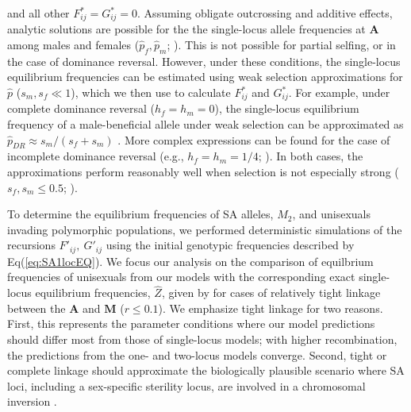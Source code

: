 \documentclass[9pt,twocolumn,twoside,lineno]{gsajnl}
\begin{document}
\noindent and all other $F^{\ast}_{ij} = G^{\ast}_{ij} =0$. Assuming obligate outcrossing and additive effects, analytic solutions are possible for the the single-locus allele frequencies at $\mathbf{A}$ among males and females ($\hat{p}_f,\hat{p}_m$; \citealt{Kidwell1977}). This is not possible for partial selfing, or in the case of dominance reversal. However, under these conditions, the single-locus equilibrium frequencies can be estimated using weak selection approximations for $\hat{p}$ ($s_m,s_f \ll 1$), which we then use to calculate $F^{\ast}_{ij}$ and $G^{\ast}_{ij}$. For example, under complete dominance reversal ($h_f=h_m=0$), the single-locus equilibrium frequency of a male-beneficial allele under weak selection can be approximated as $\hat{p}_{DR} \approx s_m/(s_f + s_m)$ \citep{ConnallonJordan2016}. More complex expressions can be found for the case of incomplete dominance reversal (e.g., $h_f=h_m=1/4$; \citealt{JordanConnallon2014,Olito2016}). In both cases, the approximations perform reasonably well when selection is not especially strong ($s_f,s_m \leq 0.5$; \citealt{JordanConnallon2014,ConnallonJordan2016,Olito2016}). 

To determine the equilibrium frequencies of SA alleles, $M_2$, and unisexuals invading polymorphic populations, we performed deterministic simulations of the recursions $F'_{ij},~G'_{ij}$ using the initial genotypic frequencies described by Eq(\ref{eq:SA1locEQ}). We focus our analysis on the comparison of equilbrium frequencies of unisexuals from our models with the corresponding exact single-locus equilibrium frequencies, $\hat{Z}$, given by \citet{Charlesworth1978a} for cases of relatively tight linkage between the $\mathbf{A}$ and $\mathbf{M}$ ($r\leq 0.1$). We emphasize tight linkage for two reasons. First, this represents the parameter conditions where our model predictions should differ most from those of single-locus models; with higher recombination, the predictions from the one- and two-locus models converge. Second, tight or complete linkage should approximate the biologically plausible scenario where SA loci, including a sex-specific sterility locus, are involved in a chromosomal inversion \citep{LeeKelly2015}.
\end{document}
